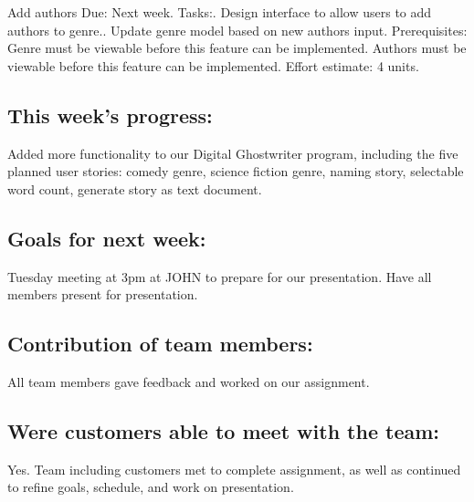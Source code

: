 \documentclass[12pt]{article}
\begin{document}
Add authors\newline
Due: Next week.\newline
Tasks:. Design interface to allow users to add authors to genre.. Update genre model based on new authors input.\newline
Prerequisites:\newline
Genre must be viewable before this feature can be implemented.\newline
Authors must be viewable before this feature can be implemented.\newline
Effort estimate: 4 units.

\subsection{This week's progress:}
Added more functionality to our Digital Ghostwriter program, including the five planned user stories: comedy genre, science fiction genre,  naming story, selectable word count, generate story as text document. 

\subsection{Goals for next week:}
Tuesday meeting at 3pm at JOHN to prepare for our presentation. Have all members present for presentation. 

\subsection{Contribution of team members:}
All team members gave feedback and worked on our assignment.

\subsection{Were customers able to meet with the team:}
Yes. Team including customers met to complete assignment, as well as continued to refine goals, schedule, and work on presentation. 
\end{document}
